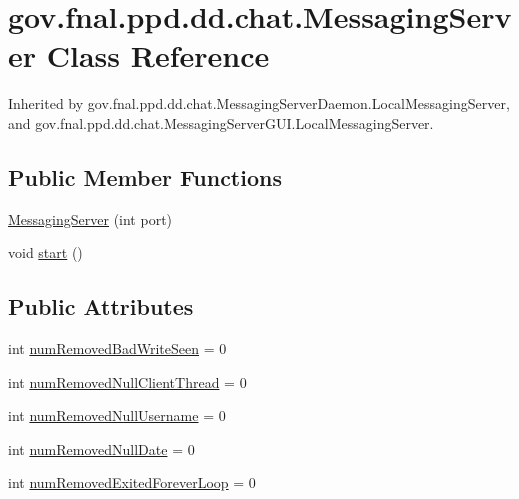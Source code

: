 \hypertarget{classgov_1_1fnal_1_1ppd_1_1dd_1_1chat_1_1MessagingServer}{\section{gov.\-fnal.\-ppd.\-dd.\-chat.\-Messaging\-Server Class Reference}
\label{classgov_1_1fnal_1_1ppd_1_1dd_1_1chat_1_1MessagingServer}
}


Inherited by gov.\-fnal.\-ppd.\-dd.\-chat.\-Messaging\-Server\-Daemon.\-Local\-Messaging\-Server, and gov.\-fnal.\-ppd.\-dd.\-chat.\-Messaging\-Server\-G\-U\-I.\-Local\-Messaging\-Server.

\subsection*{Public Member Functions}
\begin{DoxyCompactItemize}
\item 
\hyperlink{classgov_1_1fnal_1_1ppd_1_1dd_1_1chat_1_1MessagingServer_a9b02c801edad834dcc2a0c96071900af}{Messaging\-Server} (int port)
\item 
void \hyperlink{classgov_1_1fnal_1_1ppd_1_1dd_1_1chat_1_1MessagingServer_a69cf69b0f944a33ba7e1b9c32dd60ee6}{start} ()
\end{DoxyCompactItemize}
\subsection*{Public Attributes}
\begin{DoxyCompactItemize}
\item 
int \hyperlink{classgov_1_1fnal_1_1ppd_1_1dd_1_1chat_1_1MessagingServer_ae9c73322e842357c87634a60426e5bf0}{num\-Removed\-Bad\-Write\-Seen} = 0
\item 
int \hyperlink{classgov_1_1fnal_1_1ppd_1_1dd_1_1chat_1_1MessagingServer_a3fe04e43605b1c81c063cf9d334fb763}{num\-Removed\-Null\-Client\-Thread} = 0
\item 
int \hyperlink{classgov_1_1fnal_1_1ppd_1_1dd_1_1chat_1_1MessagingServer_a84d7bc143f1eee20c7e39ce9024783c9}{num\-Removed\-Null\-Username} = 0
\item 
int \hyperlink{classgov_1_1fnal_1_1ppd_1_1dd_1_1chat_1_1MessagingServer_ab986fa29bcdc51bd186ad23e1c699426}{num\-Removed\-Null\-Date} = 0
\item 
int \hyperlink{classgov_1_1fnal_1_1ppd_1_1dd_1_1chat_1_1MessagingServer_a189ff6081d21eb1a9c98887d84e23b17}{num\-Removed\-Exited\-Forever\-Loop} = 0
\end{DoxyCompactItemize}
